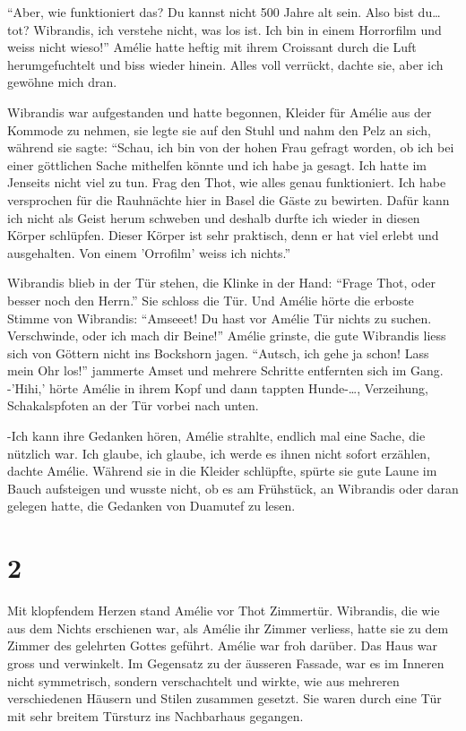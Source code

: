 \documentclass[11pt,titlepage,a5paper]{book}
\begin{document}
"`Aber, wie funktioniert das? Du kannst nicht 500 Jahre alt sein. Also bist du\dots tot? Wibrandis, ich verstehe nicht, was los ist. Ich bin in einem Horrorfilm und weiss nicht wieso!"' Amélie hatte heftig mit ihrem Croissant durch die Luft herumgefuchtelt und biss wieder hinein. Alles voll verrückt, dachte sie, aber ich gewöhne mich dran.  

Wibrandis war aufgestanden und hatte begonnen, Kleider für Amélie aus der Kommode zu nehmen, sie legte sie auf den Stuhl und nahm den Pelz an sich, während sie sagte: "`Schau, ich bin von der hohen Frau gefragt worden, ob ich bei einer göttlichen Sache mithelfen könnte und ich habe ja gesagt. Ich hatte im Jenseits nicht viel zu tun. Frag den Thot, wie alles genau funktioniert. Ich habe versprochen für die Rauhnächte hier in Basel die Gäste zu bewirten. Dafür kann ich nicht als Geist herum schweben und deshalb durfte ich wieder in diesen Körper schlüpfen. Dieser Körper ist sehr praktisch, denn er hat viel erlebt und ausgehalten. Von einem 'Orrofilm' weiss ich nichts."'

 Wibrandis blieb in der Tür stehen, die Klinke in der Hand: "`Frage Thot, oder besser noch den Herrn."' Sie schloss die Tür. Und Amélie hörte die erboste Stimme von Wibrandis: "`Amseeet! Du hast vor Amélie Tür nichts zu suchen. Verschwinde, oder ich mach dir Beine!"' Amélie grinste, die gute Wibrandis liess sich von Göttern nicht ins Bockshorn jagen.  "`Autsch, ich gehe ja schon! Lass mein Ohr los!"' jammerte Amset und mehrere Schritte entfernten sich im Gang. -'Hihi,' hörte Amélie in ihrem Kopf und dann tappten Hunde-\dots, Verzeihung, Schakalspfoten an der Tür vorbei nach unten. 
 
 -Ich kann ihre Gedanken hören, Amélie strahlte, endlich mal eine Sache, die nützlich war. Ich glaube, ich glaube, ich werde es ihnen nicht sofort erzählen, dachte Amélie. Während sie in die Kleider schlüpfte, spürte sie gute Laune im Bauch aufsteigen und wusste nicht, ob es am Frühstück, an Wibrandis oder daran gelegen hatte, die Gedanken von Duamutef zu lesen.
 
\section*{2}
 
 Mit klopfendem Herzen stand Amélie vor Thot Zimmertür. Wibrandis, die wie aus dem Nichts erschienen war, als Amélie ihr Zimmer verliess, hatte sie zu dem Zimmer des gelehrten Gottes geführt. Amélie war froh darüber. Das Haus war gross und verwinkelt. Im Gegensatz zu der äusseren Fassade, war es im Inneren nicht symmetrisch, sondern verschachtelt und wirkte, wie aus mehreren verschiedenen Häusern und Stilen zusammen gesetzt. Sie waren durch eine Tür mit sehr breitem Türsturz ins Nachbarhaus gegangen.
 
\end{document}
